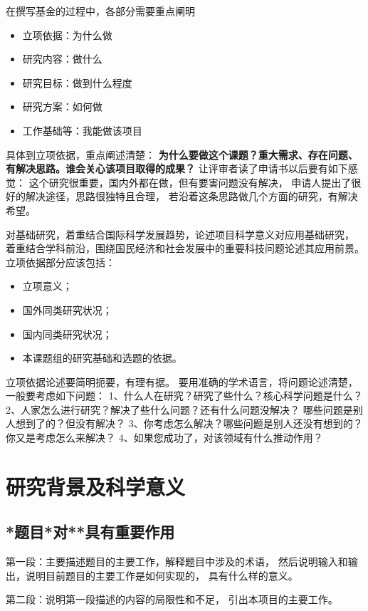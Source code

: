 \documentclass[12pt]{article}
\newcommand{\myEmph}[1]{\textbf{\textcolor[rgb]{0,0,0.25}{#1}}}
\begin{document}
在撰写基金的过程中，各部分需要重点阐明
\begin{itemize}
    \item 立项依据：为什么做
    \item 研究内容：做什么
    \item 研究目标：做到什么程度
    \item 研究方案：如何做
    \item 工作基础等：我能做该项目
\end{itemize}


具体到立项依据，重点阐述清楚：
\myEmph{为什么要做这个课题？重大需求、存在问题、有解决思路。谁会关心该项目取得的成果？}
让评审者读了申请书以后要有如下感觉：
这个研究很重要，国内外都在做，但有要害问题没有解决，
申请人提出了很好的解决途径，思路很独特且合理，
若沿着这条思路做几个方面的研究，有解决希望。


对基础研究，着重结合国际科学发展趋势，论述项目科学意义对应用基础研究，
着重结合学科前沿，围绕国民经济和社会发展中的重要科技问题论述其应用前景。
%
立项依据部分应该包括：
\begin{itemize}
    \item 立项意义；
    \item 国外同类研究状况；
    \item 国内同类研究状况；
    \item 本课题组的研究基础和选题的依据。    
\end{itemize}
立项依据论述要简明扼要，有理有据。
要用准确的学术语言，将问题论述清楚，一般要考虑如下问题：
1、什么人在研究？研究了些什么？核心科学问题是什么？ 
2、人家怎么进行研究？解决了些什么问题？还有什么问题没解决？ 
哪些问题是别人想到了的？但没有解决？
3、你考虑怎么解决？哪些问题是别人还没有想到的？你又是考虑怎么来解决？
4、如果您成功了，对该领域有什么推动作用？



\section{研究背景及科学意义}

\subsection{*题目*对**具有重要作用}

第一段：主要描述题目的主要工作，解释题目中涉及的术语，
然后说明输入和输出，说明目前题目的主要工作是如何实现的，
具有什么样的意义。

第二段：说明第一段描述的内容的局限性和不足，
引出本项目的主要工作。
\end{document}
